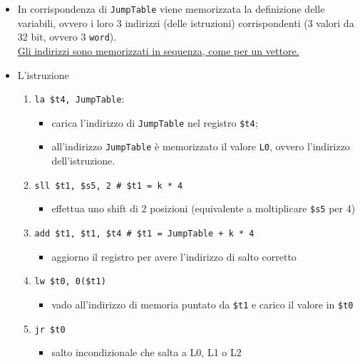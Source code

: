 \documentclass[../main.tex]{subfiles}
\begin{document}
\vspace*{1mm}

\begin{itemize}
    \item In corrispondenza di \texttt{JumpTable} viene memorizzata
    la definizione delle variabili, ovvero i loro 3 indirizzi
    (delle istruzioni) corrispondenti (3 valori da 32 bit,
    ovvero 3 \texttt{word}). \\
    \underline{Gli indirizzi sono memorizzati
    in sequenza, come per un vettore.}
    \vspace*{1mm}
    \item L'istruzione
    \begin{enumerate}
        \item \texttt{la \$t4, JumpTable}:
        \begin{itemize}
            \item carica l'indirizzo di \texttt{JumpTable}
            nel registro \texttt{\$t4};
            \item all'indirizzo \texttt{JumpTable} è memorizzato il valore
            \texttt{L0}, ovvero l'indirizzo dell'istruzione.
        \end{itemize}
        \item \texttt{sll \$t1, \$s5, 2 \hspace*{0cm} \hspace*{0cm} \# \$t1 = k * 4}
        \begin{itemize}
            \item effettua uno shift di 2 posizioni (equivalente a
            moltiplicare \texttt{\$s5} per 4)
        \end{itemize}
        \item \texttt{add \$t1, \$t1, \$t4 \# \$t1 = JumpTable + k * 4}
        \begin{itemize}
            \item aggiorno il registro per avere l'indirizzo
            di salto corretto
        \end{itemize}
        \item \texttt{lw \$t0, 0(\$t1)}
        \begin{itemize}
            \item vado all'indirizzo di memoria puntato da \texttt{\$t1}
            e carico il valore in \texttt{\$t0}
        \end{itemize}
        \item \texttt{jr \$t0}
        \begin{itemize}
            \item salto incondizionale che salta a L0, L1 o L2
        \end{itemize}
    \end{enumerate}
\end{itemize}
\end{document}
